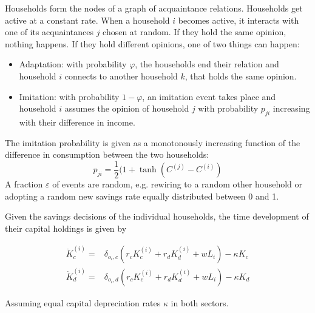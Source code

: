 Households form the nodes of a graph of acquaintance relations. Households get active at a constant rate. When a household $i$ becomes active, it interacts with one of its acquaintances $j$ chosen at random. If they hold the same opinion, nothing happens. If they hold different opinions, one of two things can happen:
\begin{itemize}
	\item Adaptation: with probability $\varphi$, the households end their relation and household $i$ connects to another household $k$, that holds the same opinion. 
	\item Imitation: with probability $1-\varphi$, an imitation event takes place and household $i$ assumes the opinion of household $j$ with probability $p_{ji}$ increasing with their difference in income.
\end{itemize}
The imitation probability is given as a monotonously increasing function of the difference in consumption between the two households:
\begin{equation}
	p_{ji} = \frac{1}{2}(1 + \tanh \left( C^{(j)} - C^{(i)}  \right)
	\label{imitation_probability}
\end{equation}
A fraction $\varepsilon$ of events are random, e.g. rewiring to a random other household or adopting a random new savings rate equally distributed between 0 and 1.

Given the savings decisions of the individual households, the time development of their capital holdings is given by

\begin{align}
	\dot{K}_c^{(i)} =& \delta_{o_i, c} \left( r_c K_c^{(i)} + r_d K_d^{(i)} + w L_i \right) - \kappa K_c \\
	\dot{K}_d^{(i)} =& \delta_{o_i, d} \left( r_c K_c^{(i)} + r_d K_d^{(i)} + w L_i \right) - \kappa K_d 
\end{align}

Assuming equal capital depreciation rates $\kappa$ in both sectors.
